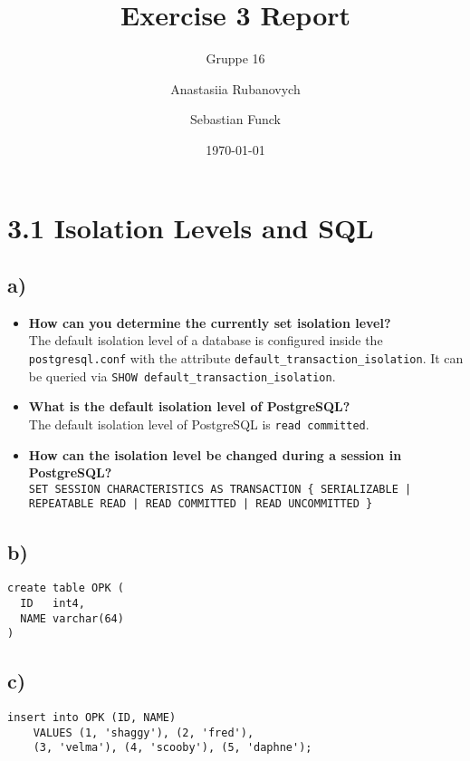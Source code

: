 \documentclass[a4paper,english,abstract=on]{scrartcl}
\title{Exercise 3 Report}
\subtitle{Gruppe 16}
\author{Anastasiia Rubanovych\and Sebastian Funck}
\date{\today}
\begin{document}
\maketitle

\section*{3.1 Isolation Levels and SQL}
\subsection*{a)}
\begin{itemize}
	\item \textbf{How can you determine the currently set isolation level?}\\
	The default isolation level of a database is configured inside the \texttt{postgresql.conf} with the attribute \texttt{default\_transaction\_isolation}. It can be queried via \texttt{SHOW default\_transaction\_isolation}.
	
	\item \textbf{What is the default isolation level of PostgreSQL?}\\
	The default isolation level of PostgreSQL is \texttt{read committed}.
		
	\item \textbf{How can the isolation level be changed during a session in PostgreSQL?}\\
	\texttt{SET SESSION CHARACTERISTICS AS TRANSACTION \{ SERIALIZABLE | REPEATABLE READ | READ COMMITTED | READ UNCOMMITTED \}}
\end{itemize}

\subsection*{b)}
\begin{lstlisting}
create table OPK (
  ID   int4,
  NAME varchar(64)
)
\end{lstlisting}

\subsection*{c)}
\begin{lstlisting}
insert into OPK (ID, NAME) 	
    VALUES (1, 'shaggy'), (2, 'fred'),
    (3, 'velma'), (4, 'scooby'), (5, 'daphne');
\end{lstlisting}
\end{document}
